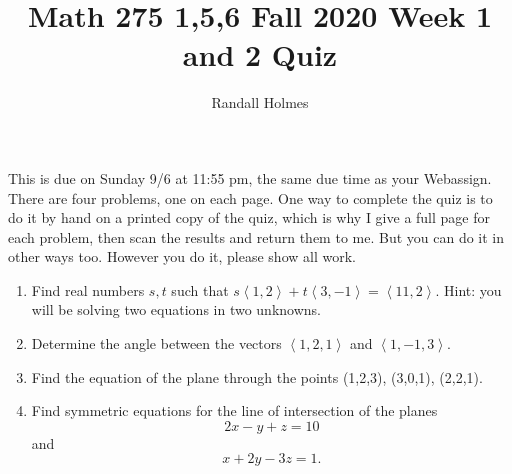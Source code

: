 \documentclass[12pt]{article}
\title {Math 275 1,5,6 Fall 2020 Week 1 and 2 Quiz}
\author{Randall Holmes}
\begin{document}
\maketitle

This is due on Sunday 9/6 at 11:55 pm, the same due time as your Webassign.   There are four problems, one on each page.  One way to complete the quiz is to do it by hand on a printed copy of  the quiz, which is why I give a full page for each problem, then scan the results and return them to me.  But you can do it in other ways too.  However you do it, please show all work.
\begin{enumerate}

\item  Find real numbers $s,t$ such that $s\left<1,2\right> + t\left<3,-1\right>= \left<11,2\right>$.  Hint:  you will be solving two equations in two unknowns.

\newpage

\item  Determine the angle between the vectors $\left<1,2,1\right>$ and $\left<1,-1,3\right>$.

\newpage

\item  Find the equation of the plane through the points (1,2,3),  (3,0,1), (2,2,1).

\newpage

\item  Find symmetric equations for the line of intersection of the planes $$2x-y+z = 10$$ and $$x+2y-3z = 1.$$

\end{enumerate}
\end{document}
